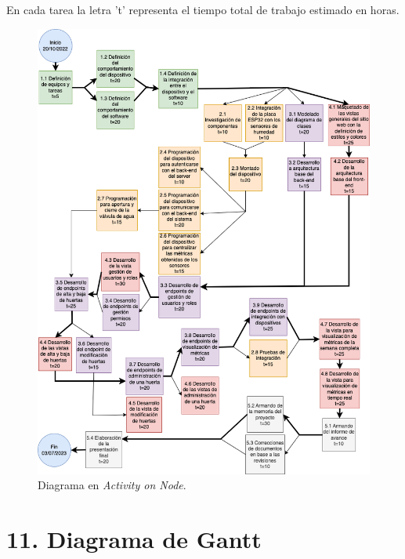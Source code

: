 \documentclass[
11pt, %
codirector, %
]{charter}
\begin{document}
En cada tarea la letra 't' representa el tiempo total de trabajo estimado en horas.

\begin{figure}[htpb]
\centering 
\includegraphics[width=.9\textwidth]{./Figuras/AoN.png}
\caption{Diagrama en \textit{Activity on Node}.}
\label{fig:AoN}
\end{figure}

\section{11. Diagrama de Gantt}
\label{sec:gantt}
\end{document}
